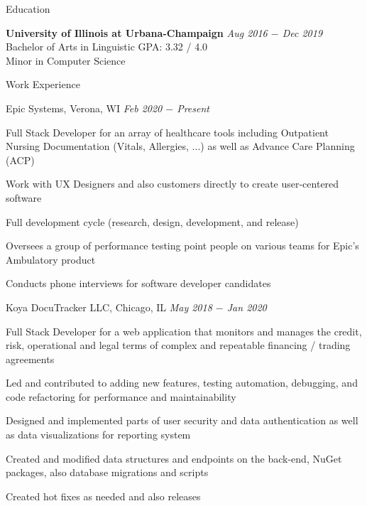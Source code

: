 \documentclass{resume}
\begin{document}
\begin{rSection}{Education}

{\bf University of Illinois at Urbana-Champaign} \hfill {\em Aug 2016 $-$ Dec 2019}
\\ Bachelor of Arts in Linguistic\hfill { GPA: 3.32 / 4.0 }
\\ Minor in Computer Science
\end{rSection}

\begin{rSection}{Work Experience}

\begin{rSubsection}{Epic Systems, Verona, WI} {\textit{Feb 2020 $-$ Present}}
{}

    \item Full Stack Developer for an array of healthcare tools including Outpatient Nursing Documentation (Vitals, Allergies, ...) as well as Advance Care Planning (ACP)
    \item Work with UX Designers and also customers directly to create user-centered software
    \item Full development cycle (research, design, development, and release)
    \item Oversees a group of performance testing point people on various teams for Epic's Ambulatory product
    \item Conducts phone interviews for software developer candidates
    
\end{rSubsection}

\begin{rSubsection}{Koya DocuTracker LLC, Chicago, IL} {\textit{May 2018 $-$ Jan 2020}}
{}

    \item Full Stack Developer for a web application that monitors and manages the credit, risk, operational and legal terms of complex and repeatable financing / trading agreements
    \item Led and contributed to adding new features, testing automation, debugging, and code refactoring for performance and maintainability
    \item Designed and implemented parts of user security and data authentication as well as data visualizations for reporting system
    \item Created and modified data structures and endpoints on the back-end, NuGet packages, also database migrations and scripts
    \item Created hot fixes as needed and also releases

\end{rSubsection}

\end{rSection}
\end{document}
